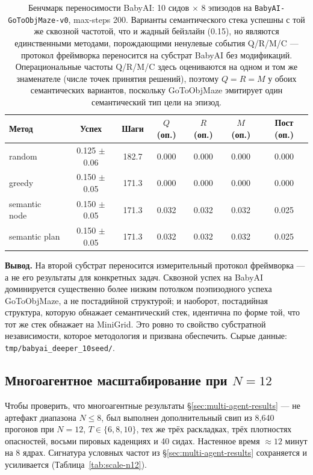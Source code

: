 \documentclass{article}
\begin{document}
\begin{table}[h]
\centering
\caption{Бенчмарк переносимости BabyAI: 10 сидов $\times$ 8 эпизодов на \texttt{BabyAI-GoToObjMaze-v0}, max-steps 200. Варианты семантического стека успешны с той же сквозной частотой, что и жадный бейзлайн (0.15), но являются единственными методами, порождающими ненулевые события Q/R/M/C --- протокол фреймворка переносится на субстрат BabyAI без модификаций. Операциональные частоты Q/R/M/C здесь оцениваются на одном и том же знаменателе (числе точек принятия решений), поэтому $Q{=}R{=}M$ у обоих семантических вариантов, поскольку GoToObjMaze эмитирует один семантический тип цели на эпизод.}
\label{tab:babyai-deeper}
\small
\begin{tabular}{l c c c c c c}
\toprule
Метод & Успех & Шаги & $Q$ (оп.) & $R$ (оп.) & $M$ (оп.) & Пост (оп.) \\
\midrule
random         & 0.125 $\pm$ 0.06 & 182.7 & 0.000 & 0.000 & 0.000 & 0.000 \\
greedy         & 0.150 $\pm$ 0.05 & 171.3 & 0.000 & 0.000 & 0.000 & 0.000 \\
semantic node  & 0.150 $\pm$ 0.05 & 171.3 & 0.032 & 0.032 & 0.032 & 0.025 \\
semantic plan  & 0.150 $\pm$ 0.05 & 171.3 & 0.032 & 0.032 & 0.032 & 0.025 \\
\bottomrule
\end{tabular}
\end{table}

\textbf{Вывод.} На второй субстрат переносится измерительный протокол фреймворка --- а не его результаты для конкретных задач. Сквозной успех на BabyAI доминируется существенно более низким потолком поэпизодного успеха GoToObjMaze, а не постадийной структурой; и наоборот, постадийная структура, которую обнажает семантический стек, идентична по форме той, что тот же стек обнажает на MiniGrid. Это ровно то свойство субстратной независимости, которое методология и призвана обеспечить. Сырые данные: \texttt{tmp/babyai\_deeper\_10seed/}.

\subsection{Многоагентное масштабирование при $N=12$}
\label{app:scale-N12}

Чтобы проверить, что многоагентные результаты \S\ref{sec:multi-agent-results} --- не артефакт диапазона $N\!\le\!8$, был выполнен дополнительный свип из 8{,}640 прогонов при $N\!=\!12$, $T \in \{6, 8, 10\}$, тех же трёх раскладках, трёх плотностях опасностей, восьми пировых каденциях и 40 сидах. Настенное время $\approx 12$ минут на 8 ядрах. Сигнатура условных частот из \S\ref{sec:multi-agent-results} сохраняется и усиливается (Таблица~\ref{tab:scale-n12}).
\end{document}
